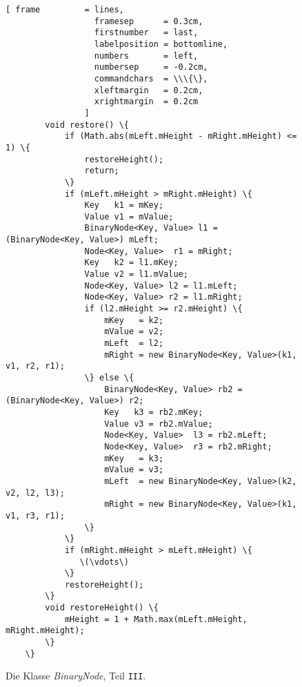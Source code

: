 \begin{figure}[!ht]
  \centering
\begin{Verbatim}[ frame         = lines, 
                  framesep      = 0.3cm, 
                  firstnumber   = last,
                  labelposition = bottomline,
                  numbers       = left,
                  numbersep     = -0.2cm,
                  commandchars  = \\\{\},
                  xleftmargin   = 0.2cm,
                  xrightmargin  = 0.2cm
                ]
        void restore() \{
            if (Math.abs(mLeft.mHeight - mRight.mHeight) <= 1) \{
                restoreHeight();
                return;
            \}
            if (mLeft.mHeight > mRight.mHeight) \{
                Key   k1 = mKey;
                Value v1 = mValue;
                BinaryNode<Key, Value> l1 = (BinaryNode<Key, Value>) mLeft;
                Node<Key, Value>  r1 = mRight;
                Key   k2 = l1.mKey;
                Value v2 = l1.mValue;
                Node<Key, Value> l2 = l1.mLeft;
                Node<Key, Value> r2 = l1.mRight;
                if (l2.mHeight >= r2.mHeight) \{
                    mKey   = k2;
                    mValue = v2;
                    mLeft  = l2;
                    mRight = new BinaryNode<Key, Value>(k1, v1, r2, r1);
                \} else \{
                    BinaryNode<Key, Value> rb2 = (BinaryNode<Key, Value>) r2;
                    Key   k3 = rb2.mKey;
                    Value v3 = rb2.mValue;
                    Node<Key, Value>  l3 = rb2.mLeft;
                    Node<Key, Value>  r3 = rb2.mRight;
                    mKey   = k3;
                    mValue = v3;
                    mLeft  = new BinaryNode<Key, Value>(k2, v2, l2, l3);
                    mRight = new BinaryNode<Key, Value>(k1, v1, r3, r1);
                \}
            \}
            if (mRight.mHeight > mLeft.mHeight) \{
               \(\vdots\)
            \}
            restoreHeight();
        \}
        void restoreHeight() \{
            mHeight = 1 + Math.max(mLeft.mHeight, mRight.mHeight);
        \}
    \}
\end{Verbatim}
\vspace*{-0.3cm}
  \caption{Die Klasse \textsl{BinaryNode}, Teil \texttt{III}.}
  \label{fig:BinaryNode-AVL-III.java}
\end{figure}


